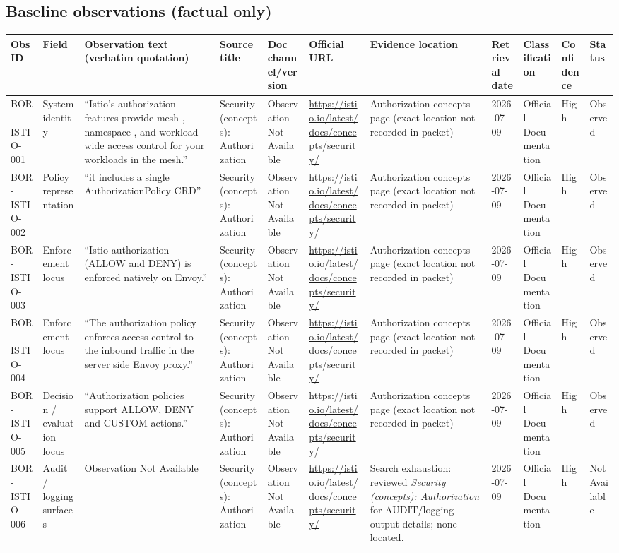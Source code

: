 \documentclass[11pt]{article}
\begin{document}
\subsection*{Baseline observations (factual only)}
\begin{longtable}{@{}L{0.95in}L{1.05in}L{2.05in}L{1.55in}L{0.95in}L{1.55in}L{1.10in}L{0.75in}L{0.95in}L{0.75in}L{0.8in}@{}}
\toprule
Obs ID & Field & Observation text (verbatim quotation) & Source title & Doc channel/version & Official URL & Evidence location & Retrieval date & Classification & Confidence & Status\\
\midrule
\endhead
BOR-ISTIO-001 & System identity & ``Istio’s authorization features provide mesh-, namespace-, and workload-wide access control for your workloads in the mesh.'' & Security (concepts): Authorization & Observation Not Available & \url{https://istio.io/latest/docs/concepts/security/} & Authorization concepts page (exact location not recorded in packet) & 2026-07-09 & Official Documentation & High & Observed\\
BOR-ISTIO-002 & Policy representation & ``it includes a single AuthorizationPolicy CRD'' & Security (concepts): Authorization & Observation Not Available & \url{https://istio.io/latest/docs/concepts/security/} & Authorization concepts page (exact location not recorded in packet) & 2026-07-09 & Official Documentation & High & Observed\\
BOR-ISTIO-003 & Enforcement locus & ``Istio authorization (ALLOW and DENY) is enforced natively on Envoy.'' & Security (concepts): Authorization & Observation Not Available & \url{https://istio.io/latest/docs/concepts/security/} & Authorization concepts page (exact location not recorded in packet) & 2026-07-09 & Official Documentation & High & Observed\\
BOR-ISTIO-004 & Enforcement locus & ``The authorization policy enforces access control to the inbound traffic in the server side Envoy proxy.'' & Security (concepts): Authorization & Observation Not Available & \url{https://istio.io/latest/docs/concepts/security/} & Authorization concepts page (exact location not recorded in packet) & 2026-07-09 & Official Documentation & High & Observed\\
BOR-ISTIO-005 & Decision / evaluation locus & ``Authorization policies support ALLOW, DENY and CUSTOM actions.'' & Security (concepts): Authorization & Observation Not Available & \url{https://istio.io/latest/docs/concepts/security/} & Authorization concepts page (exact location not recorded in packet) & 2026-07-09 & Official Documentation & High & Observed\\
BOR-ISTIO-006 & Audit / logging surfaces & Observation Not Available & Security (concepts): Authorization & Observation Not Available & \url{https://istio.io/latest/docs/concepts/security/} & Search exhaustion: reviewed \textit{Security (concepts): Authorization} for AUDIT/logging output details; none located. & 2026-07-09 & Official Documentation & High & Not Available\\
\bottomrule
\end{longtable}
\end{document}
